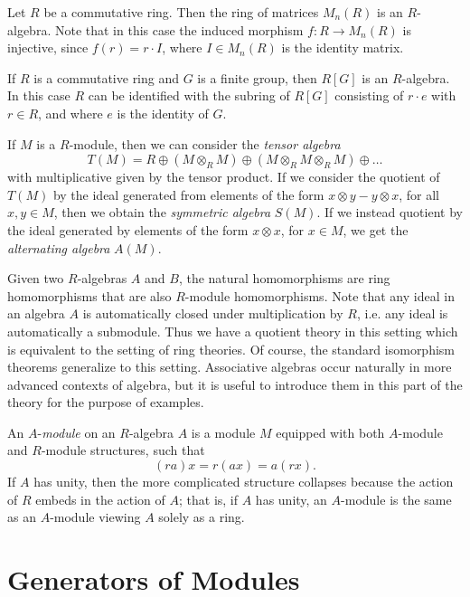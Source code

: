 \begin{example}
    Let $R$ be a commutative ring. Then the ring of matrices $M_n(R)$ is an $R$-algebra. Note that in this case the induced morphism $f: R \to M_n(R)$ is injective, since $f(r) = r \cdot I$, where $I \in M_n(R)$ is the identity matrix.
\end{example}

\begin{example}
    If $R$ is a commutative ring and $G$ is a finite group, then $R[G]$ is an $R$-algebra. In this case $R$ can be identified with the subring of $R[G]$ consisting of $r \cdot e$ with $r \in R$, and where $e$ is the identity of $G$.
\end{example}

\begin{example}
    If $M$ is a $R$-module, then we can consider the \emph{tensor algebra}
    \[ T(M) = R \oplus (M \otimes_R M) \oplus (M \otimes_R M \otimes_R M) \oplus \dots \]
    with multiplicative given by the tensor product. If we consider the quotient of $T(M)$ by the ideal generated from elements of the form $x \otimes y - y \otimes x$, for all $x,y \in M$, then we obtain the \emph{symmetric algebra} $S(M)$. If we instead quotient by the ideal generated by elements of the form $x \otimes x$, for $x \in M$, we get the \emph{alternating algebra} $A(M)$.
\end{example}

Given two $R$-algebras $A$ and $B$, the natural homomorphisms are ring homomorphisms that are also $R$-module homomorphisms. Note that any ideal in an algebra $A$ is automatically closed under multiplication by $R$, i.e. any ideal is automatically a submodule. Thus we have a quotient theory in this setting which is equivalent to the setting of ring theories. Of course, the standard isomorphism theorems generalize to this setting. Associative algebras occur naturally in more advanced contexts of algebra, but it is useful to introduce them in this part of the theory for the purpose of examples.

An $A$-\emph{module} on an $R$-algebra $A$ is a module $M$ equipped with both $A$-module and $R$-module structures, such that
%
\[ (ra) x = r(ax) = a(rx). \]
%
If $A$ has unity, then the more complicated structure collapses because the action of $R$ embeds in the action of $A$; that is, if $A$ has unity, an $A$-module is the same as an $A$-module viewing $A$ solely as a ring.

\section{Generators of Modules}

